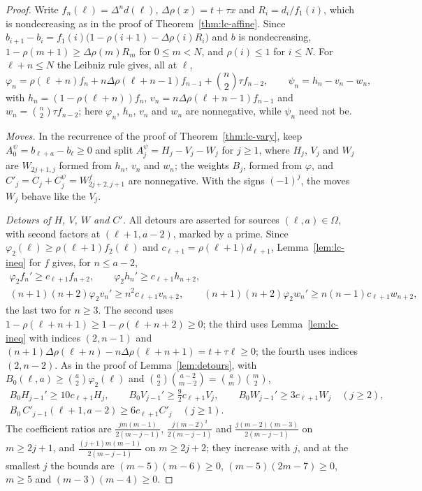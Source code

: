 \begin{proof}
Write $f_n(\ell)=\Delta^nd(\ell)$, $\Delta\rho(x)=t+\tau x$ and $R_i=d_i/f_1(i)$, which is nondecreasing as in the proof of Theorem~\ref{thm:lc-affine}. Since $b_{i+1}-b_i=f_1(i)\bigl(1-\rho(i+1)-\Delta\rho(i)R_i\bigr)$ and $b$ is nondecreasing, $1-\rho(m+1)\geq\Delta\rho(m)R_m$ for $0\leq m<N$, and $\rho(i)\leq1$ for $i\leq N$. For $\ell+n\leq N$ the Leibniz rule gives, all at $\ell$,
\[
\varphi_n=\rho(\ell+n)f_n+n\Delta\rho(\ell+n-1)f_{n-1}+\binom n2\tau f_{n-2},\qquad\psi_n=h_n-v_n-w_n,
\]
with $h_n=(1-\rho(\ell+n))f_n$, $v_n=n\Delta\rho(\ell+n-1)f_{n-1}$ and $w_n=\binom n2\tau f_{n-2}$; here $\varphi_n$, $h_n$, $v_n$ and $w_n$ are nonnegative, while $\psi_n$ need not be.

\emph{Moves.} In the recurrence of the proof of Theorem~\ref{thm:lc-vary}, keep $A^\psi_0=b_{\ell+a}-b_\ell\geq0$ and split $A^\psi_j=H_j-V_j-W_j$ for $j\geq1$, where $H_j$, $V_j$ and $W_j$ are $W_{2j+1,j}$ formed from $h_n$, $v_n$ and $w_n$; the weights $B_j$, formed from $\varphi$, and $C'_j=C_j+C^\psi_j=W^f_{2j+2,j+1}$ are nonnegative. With the signs $(-1)^j$, the moves $W_j$ behave like the $V_j$.

\emph{Detours of $H$, $V$, $W$ and $C'$.} All detours are asserted for sources $(\ell,a)\in\Omega$, with second factors at $(\ell+1,a-2)$, marked by a prime. Since $\varphi_2(\ell)\geq\rho(\ell+1)f_2(\ell)$ and $c_{\ell+1}=\rho(\ell+1)d_{\ell+1}$, Lemma~\ref{lem:lc-ineq} for $f$ gives, for $n\leq a-2$,
\[
\begin{gathered}
\varphi_2f_n'\geq c_{\ell+1}f_{n+2},\qquad\varphi_2h_n'\geq c_{\ell+1}h_{n+2},\\
(n+1)(n+2)\varphi_2v_n'\geq n^2c_{\ell+1}v_{n+2},\qquad(n+1)(n+2)\varphi_2w_n'\geq n(n-1)c_{\ell+1}w_{n+2},
\end{gathered}
\]
the last two for $n\geq3$. The second uses $1-\rho(\ell+n+1)\geq1-\rho(\ell+n+2)\geq0$; the third uses Lemma~\ref{lem:lc-ineq} with indices $(2,n-1)$ and $(n+1)\Delta\rho(\ell+n)-n\Delta\rho(\ell+n+1)=t+\tau\ell\geq0$; the fourth uses indices $(2,n-2)$. As in the proof of Lemma~\ref{lem:detours}, with $B_0(\ell,a)\geq\binom a2\varphi_2(\ell)$ and $\binom a2\binom{a-2}{m-2}=\binom am\binom m2$,
\[
\begin{gathered}
B_0H_{j-1}'\geq10c_{\ell+1}H_j,\qquad B_0V_{j-1}'\geq\tfrac92c_{\ell+1}V_j,\qquad B_0W_{j-1}'\geq3c_{\ell+1}W_j\quad(j\geq2),\\
B_0\,C'_{j-1}(\ell+1,a-2)\geq6c_{\ell+1}C'_j\quad(j\geq1).
\end{gathered}
\]
The coefficient ratios are $\frac{jm(m-1)}{2(m-j-1)}$, $\frac{j(m-2)^2}{2(m-j-1)}$ and $\frac{j(m-2)(m-3)}{2(m-j-1)}$ on $m\geq2j+1$, and $\frac{(j+1)m(m-1)}{2(m-j-1)}$ on $m\geq2j+2$; they increase with $j$, and at the smallest $j$ the bounds are $(m-5)(m-6)\geq0$, $(m-5)(2m-7)\geq0$, $m\geq5$ and $(m-3)(m-4)\geq0$.


\end{proof}
